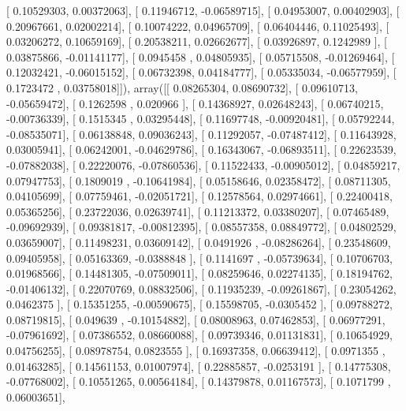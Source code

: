 \documentclass{article}
\begin{document}
       [ 0.10529303,  0.00372063],
       [ 0.11946712, -0.06589715],
       [ 0.04953007,  0.00402903],
       [ 0.20967661,  0.02002214],
       [ 0.10074222,  0.04965709],
       [ 0.06404446,  0.11025493],
       [ 0.03206272,  0.10659169],
       [ 0.20538211,  0.02662677],
       [ 0.03926897,  0.1242989 ],
       [ 0.03875866, -0.01141177],
       [ 0.0945458 ,  0.04805935],
       [ 0.05715508, -0.01269464],
       [ 0.12032421, -0.06015152],
       [ 0.06732398,  0.04184777],
       [ 0.05335034, -0.06577959],
       [ 0.1723472 ,  0.03758018]]), array([[ 0.08265304,  0.08690732],
       [ 0.09610713, -0.05659472],
       [ 0.1262598 ,  0.020966  ],
       [ 0.14368927,  0.02648243],
       [ 0.06740215, -0.00736339],
       [ 0.1515345 ,  0.03295448],
       [ 0.11697748, -0.00920481],
       [ 0.05792244, -0.08535071],
       [ 0.06138848,  0.09036243],
       [ 0.11292057, -0.07487412],
       [ 0.11643928,  0.03005941],
       [ 0.06242001, -0.04629786],
       [ 0.16343067, -0.06893511],
       [ 0.22623539, -0.07882038],
       [ 0.22220076, -0.07860536],
       [ 0.11522433, -0.00905012],
       [ 0.04859217,  0.07947753],
       [ 0.1809019 , -0.10641984],
       [ 0.05158646,  0.02358472],
       [ 0.08711305,  0.04105699],
       [ 0.07759461, -0.02051721],
       [ 0.12578564,  0.02974661],
       [ 0.22400418,  0.05365256],
       [ 0.23722036,  0.02639741],
       [ 0.11213372,  0.03380207],
       [ 0.07465489, -0.09692939],
       [ 0.09381817, -0.00812395],
       [ 0.08557358,  0.08849772],
       [ 0.04802529,  0.03659007],
       [ 0.11498231,  0.03609142],
       [ 0.0491926 , -0.08286264],
       [ 0.23548609,  0.09405958],
       [ 0.05163369, -0.0388848 ],
       [ 0.1141697 , -0.05739634],
       [ 0.10706703,  0.01968566],
       [ 0.14481305, -0.07509011],
       [ 0.08259646,  0.02274135],
       [ 0.18194762, -0.01406132],
       [ 0.22070769,  0.08832506],
       [ 0.11935239, -0.09261867],
       [ 0.23054262,  0.0462375 ],
       [ 0.15351255, -0.00590675],
       [ 0.15598705, -0.0305452 ],
       [ 0.09788272,  0.08719815],
       [ 0.049639  , -0.10154882],
       [ 0.08008963,  0.07462853],
       [ 0.06977291, -0.07961692],
       [ 0.07386552,  0.08660088],
       [ 0.09739346,  0.01131831],
       [ 0.10654929,  0.04756255],
       [ 0.08978754,  0.0823555 ],
       [ 0.16937358,  0.06639412],
       [ 0.0971355 ,  0.01463285],
       [ 0.14561153,  0.01007974],
       [ 0.22885857, -0.0253191 ],
       [ 0.14775308, -0.07768002],
       [ 0.10551265,  0.00564184],
       [ 0.14379878,  0.01167573],
       [ 0.1071799 ,  0.06003651],
\end{document}
